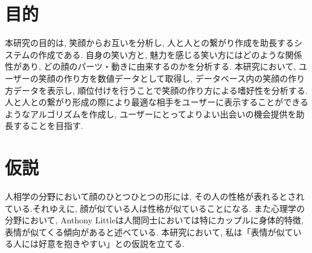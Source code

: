 \section{目的}
本研究の目的は, 笑顔からお互いを分析し, 人と人との繋がり作成を助長するシステムの作成である.
自身の笑い方と, 魅力を感じる笑い方にはどのような関係性があり, どの顔のパーツ・動きに由来するのかを分析する.
本研究において, ユーザーの笑顔の作り方を数値データとして取得し,
データベース内の笑顔の作り方データを表示し, 順位付けを行うことで笑顔の作り方による嗜好性を分析する.
人と人との繋がり形成の際により最適な相手をユーザーに表示することができるようなアルゴリズムを作成し,
ユーザーにとってよりよい出会いの機会提供を助長することを目指す.


\section{仮説}
人相学の分野において顔のひとつひとつの形には, その人の性格が表れるとされている.それゆえに, 顔が似ている人は性格が似ていることになる.
また心理学の分野において, Anthony Littleは人間同士においては特にカップルに身体的特徴, 表情が似てくる傾向があると述べている.\cite{AnthonyLittle}
本研究において, 私は「表情が似ている人には好意を抱きやすい」との仮説を立てる.




